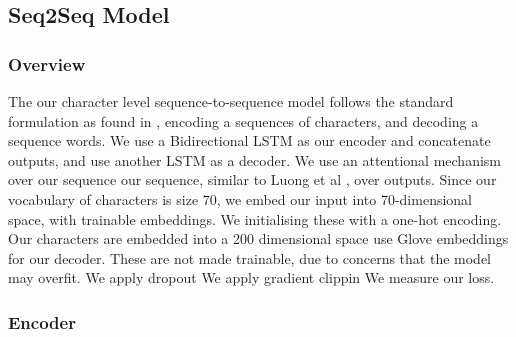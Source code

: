 








\subsection{Seq2Seq Model} %
\label{sec:character_level_sequence_to_sequence}

\subsubsection{Overview}

The our character level sequence-to-sequence model follows the standard formulation as found in \cite{sutskever_sequence_2014} \cite{bahdanau_neural_2014}, encoding a sequences of characters, and decoding a sequence words. 
We use a Bidirectional LSTM as our encoder and concatenate outputs, and use another LSTM as a decoder.
We use an attentional mechanism over our sequence our sequence, similar to Luong et al \cite{luong_effective_2015}, over outputs.
Since our vocabulary of characters is size 70, we embed our input into 70-dimensional space, with trainable embeddings. We initialising these with a one-hot encoding.
Our characters are embedded into a 200 dimensional space use Glove embeddings for our decoder. 
These are not made trainable, due to concerns that the model may overfit. 
We apply dropout
We apply gradient clippin
We measure our loss.

\subsubsection{Encoder}

